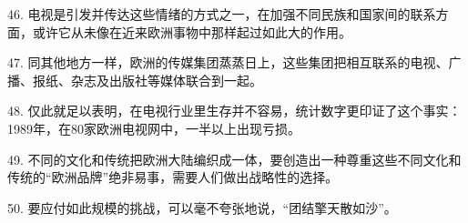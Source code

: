 46. 电视是引发并传达这些情绪的方式之一，在加强不同民族和国家间的联系方面，或许它从未像在近来欧洲事物中那样起过如此大的作用。

47. 同其他地方一样，欧洲的传媒集团蒸蒸日上，这些集团把相互联系的电视、广播、报纸、杂志及出版社等媒体联合到一起。

48. 仅此就足以表明，在电视行业里生存并不容易，统计数字更印证了这个事实：1989年，在80家欧洲电视网中，一半以上出现亏损。

49. 不同的文化和传统把欧洲大陆编织成一体，要创造出一种尊重这些不同文化和传统的“欧洲品牌”绝非易事，需要人们做出战略性的选择。

50. 要应付如此规模的挑战，可以毫不夸张地说，“团结擎天散如沙”。